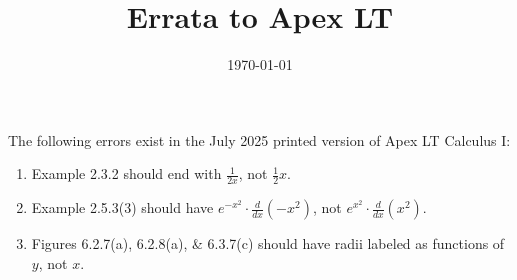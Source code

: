 \documentclass{amsart}
\title{Errata to Apex LT}
\date{\today}
\begin{document}

\maketitle

The following errors exist in the July 2025 printed version of Apex LT Calculus I:
\begin{enumerate}
\item Example 2.3.2 should end with $\frac1{2x}$, not $\frac12x$.
\item Example 2.5.3(3) should have $e^{-x^2}\cdot\frac{d}{dx}(-x^2)$, not $e^{x^2}\cdot\frac{d}{dx}(x^2)$.
\item Figures 6.2.7(a), 6.2.8(a), \& 6.3.7(c) should have radii labeled as functions of $y$, not $x$.
\label{2025-07I}
\end{enumerate}
\end{document}
